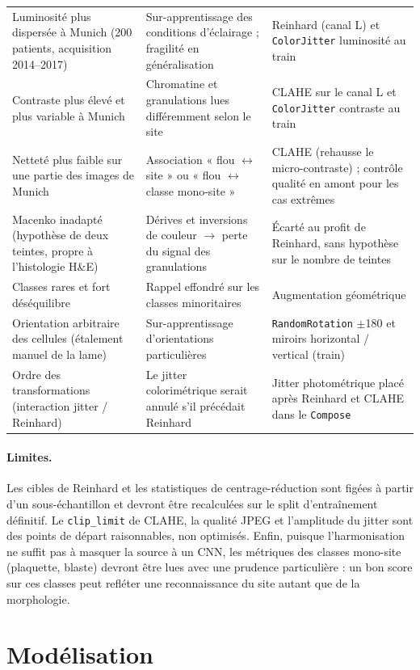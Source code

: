 \begin{longtable}{@{}>{\raggedright\arraybackslash}p{3.9cm} >{\raggedright\arraybackslash}p{5.1cm} >{\raggedright\arraybackslash}p{5.6cm}@{}}
  Luminosité plus dispersée à Munich (200 patients, acquisition 2014--2017) & Sur-apprentissage des conditions d’éclairage ; fragilité en généralisation & Reinhard (canal L) et \texttt{ColorJitter} luminosité au train \\
  Contraste plus élevé et plus variable à Munich & Chromatine et granulations lues différemment selon le site & CLAHE sur le canal L et \texttt{ColorJitter} contraste au train \\
  Netteté plus faible sur une partie des images de Munich & Association « flou $\leftrightarrow$ site » ou « flou $\leftrightarrow$ classe mono-site » & CLAHE (rehausse le micro-contraste) ; contrôle qualité en amont pour les cas extrêmes \\
  Macenko inadapté (hypothèse de deux teintes, propre à l’histologie H\&E) & Dérives et inversions de couleur $\rightarrow$ perte du signal des granulations & Écarté au profit de Reinhard, sans hypothèse sur le nombre de teintes \\
  Classes rares et fort déséquilibre & Rappel effondré sur les classes minoritaires & Augmentation géométrique \\
  Orientation arbitraire des cellules (étalement manuel de la lame) & Sur-apprentissage d’orientations particulières & \texttt{RandomRotation} $\pm$180\textdegree{} et miroirs horizontal / vertical (train) \\
  Ordre des transformations (interaction jitter / Reinhard) & Le jitter colorimétrique serait annulé s’il précédait Reinhard & Jitter photométrique placé après Reinhard et CLAHE dans le \texttt{Compose} \\
\end{longtable}
\endgroup

\paragraph{Limites.} Les cibles de Reinhard et les statistiques de centrage-réduction sont figées à partir d’un sous-échantillon et devront être recalculées sur le split d’entraînement définitif.
Le \texttt{clip\_limit} de CLAHE, la qualité JPEG et l’amplitude du jitter sont des points de départ raisonnables, non optimisés.
Enfin, puisque l’harmonisation ne suffit pas à masquer la source à un CNN, les métriques des classes mono-site (plaquette, blaste) devront être lues avec une prudence particulière : un bon score sur ces classes peut refléter une reconnaissance du site autant que de la morphologie.

\section{Modélisation}
\label{sec:modelisation}

